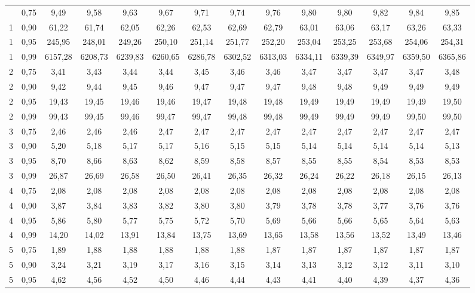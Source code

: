 \documentclass[
]{article}
\begin{document}
\begin{landscape}
\begin{longtable}[t]{cccccccccccccc}
\endfoot
\bottomrule
\endlastfoot
1 & 0,75 & 9,49 & 9,58 & 9,63 & 9,67 & 9,71 & 9,74 & 9,76 & 9,80 & 9,80 & 9,82 & 9,84 & 9,85\\
1 & 0,90 & 61,22 & 61,74 & 62,05 & 62,26 & 62,53 & 62,69 & 62,79 & 63,01 & 63,06 & 63,17 & 63,26 & 63,33\\
1 & 0,95 & 245,95 & 248,01 & 249,26 & 250,10 & 251,14 & 251,77 & 252,20 & 253,04 & 253,25 & 253,68 & 254,06 & 254,31\\
1 & 0,99 & 6157,28 & 6208,73 & 6239,83 & 6260,65 & 6286,78 & 6302,52 & 6313,03 & 6334,11 & 6339,39 & 6349,97 & 6359,50 & 6365,86\\
2 & 0,75 & 3,41 & 3,43 & 3,44 & 3,44 & 3,45 & 3,46 & 3,46 & 3,47 & 3,47 & 3,47 & 3,47 & 3,48\\
2 & 0,90 & 9,42 & 9,44 & 9,45 & 9,46 & 9,47 & 9,47 & 9,47 & 9,48 & 9,48 & 9,49 & 9,49 & 9,49\\
2 & 0,95 & 19,43 & 19,45 & 19,46 & 19,46 & 19,47 & 19,48 & 19,48 & 19,49 & 19,49 & 19,49 & 19,49 & 19,50\\
2 & 0,99 & 99,43 & 99,45 & 99,46 & 99,47 & 99,47 & 99,48 & 99,48 & 99,49 & 99,49 & 99,49 & 99,50 & 99,50\\
3 & 0,75 & 2,46 & 2,46 & 2,46 & 2,47 & 2,47 & 2,47 & 2,47 & 2,47 & 2,47 & 2,47 & 2,47 & 2,47\\
3 & 0,90 & 5,20 & 5,18 & 5,17 & 5,17 & 5,16 & 5,15 & 5,15 & 5,14 & 5,14 & 5,14 & 5,14 & 5,13\\
3 & 0,95 & 8,70 & 8,66 & 8,63 & 8,62 & 8,59 & 8,58 & 8,57 & 8,55 & 8,55 & 8,54 & 8,53 & 8,53\\
3 & 0,99 & 26,87 & 26,69 & 26,58 & 26,50 & 26,41 & 26,35 & 26,32 & 26,24 & 26,22 & 26,18 & 26,15 & 26,13\\
4 & 0,75 & 2,08 & 2,08 & 2,08 & 2,08 & 2,08 & 2,08 & 2,08 & 2,08 & 2,08 & 2,08 & 2,08 & 2,08\\
4 & 0,90 & 3,87 & 3,84 & 3,83 & 3,82 & 3,80 & 3,80 & 3,79 & 3,78 & 3,78 & 3,77 & 3,76 & 3,76\\
4 & 0,95 & 5,86 & 5,80 & 5,77 & 5,75 & 5,72 & 5,70 & 5,69 & 5,66 & 5,66 & 5,65 & 5,64 & 5,63\\
4 & 0,99 & 14,20 & 14,02 & 13,91 & 13,84 & 13,75 & 13,69 & 13,65 & 13,58 & 13,56 & 13,52 & 13,49 & 13,46\\
5 & 0,75 & 1,89 & 1,88 & 1,88 & 1,88 & 1,88 & 1,88 & 1,87 & 1,87 & 1,87 & 1,87 & 1,87 & 1,87\\
5 & 0,90 & 3,24 & 3,21 & 3,19 & 3,17 & 3,16 & 3,15 & 3,14 & 3,13 & 3,12 & 3,12 & 3,11 & 3,10\\
5 & 0,95 & 4,62 & 4,56 & 4,52 & 4,50 & 4,46 & 4,44 & 4,43 & 4,41 & 4,40 & 4,39 & 4,37 & 4,36\\

\end{longtable}
\end{landscape}
\end{document}
